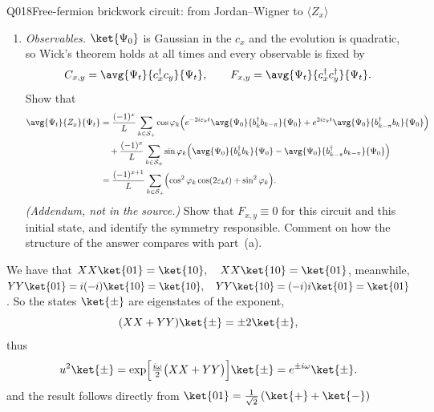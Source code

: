 \begin{entry}{Q018}{Free-fermion brickwork circuit: from Jordan--Wigner to $\langle Z_x\rangle$}
\begin{problem}
\begin{enumerate}[label=\textbf{(\alph*)},leftmargin=*]
  \item \emph{Observables.} $\ket{\Psi_0}$ is Gaussian in the $c_x$ and the evolution is
        quadratic, so Wick's theorem holds at all times and every observable is fixed by
        \[
          C_{x,y}=\avg{\Psi_t}{c^{\dagger}_xc_y}{\Psi_t},
          \qquad
          F_{x,y}=\avg{\Psi_t}{c^{\dagger}_xc^{\dagger}_y}{\Psi_t}.
        \]
        Show that
        \begin{align*}
          \avg{\Psi_t}{Z_x}{\Psi_t}
          &=\frac{(-1)^{x}}{L}\sum_{k\in\mathcal S_+}\cos\varphi_k
             \Bigl(e^{-2i\varepsilon_kt}\avg{\Psi_0}{b^{\dagger}_kb_{k-\pi}}{\Psi_0}
             +e^{2i\varepsilon_kt}\avg{\Psi_0}{b^{\dagger}_{k-\pi}b_k}{\Psi_0}\Bigr)\\
          &\quad+\frac{(-1)^{x}}{L}\sum_{k\in\mathcal S_+}\sin\varphi_k
             \Bigl(\avg{\Psi_0}{b^{\dagger}_kb_k}{\Psi_0}
             -\avg{\Psi_0}{b^{\dagger}_{k-\pi}b_{k-\pi}}{\Psi_0}\Bigr)\\
          &=\frac{(-1)^{x+1}}{L}\sum_{k\in\mathcal S_+}
             \Bigl(\cos^{2}\varphi_k\cos(2\varepsilon_kt)+\sin^{2}\varphi_k\Bigr) .
        \end{align*}
        \emph{(Addendum, not in the source.)} Show that $F_{x,y}\equiv 0$ for this
        circuit and this initial state, and identify the symmetry responsible. Comment
        on how the structure of the answer compares with part~(a).
\end{enumerate}
\end{problem}
 
 
\begin{solution}[Part (a)]
We have that $XX\ket{01}=\ket{10},\quad XX\ket{10}=\ket{01}$, meanwhile,
$YY\ket{01}=i(-i)\ket{10}=\ket{10},\quad YY\ket{10}=(-i)i\ket{01}=\ket{01}$. So the
states $\ket{\pm}$ are eigenstates of the exponent,
\[
  (XX+YY)\ket{\pm}=\pm2\ket{\pm},
\]
thus
\begin{equation}
    u^2\ket{\pm}=\exp\Bigl[\tfrac{i\omega}{2}\bigl(XX+YY\bigr)\Bigr]\ket{\pm}= e^{\pm i\omega}\ket{\pm} .
\end{equation}
and the result follows directly from 
$\ket{01}= \frac{1}{\sqrt{2}}\left( \ket{+} + \ket{-} \right)$
\end{solution}
 
\begin{solution}[Part (b)]
\end{solution}
 

\end{entry}
